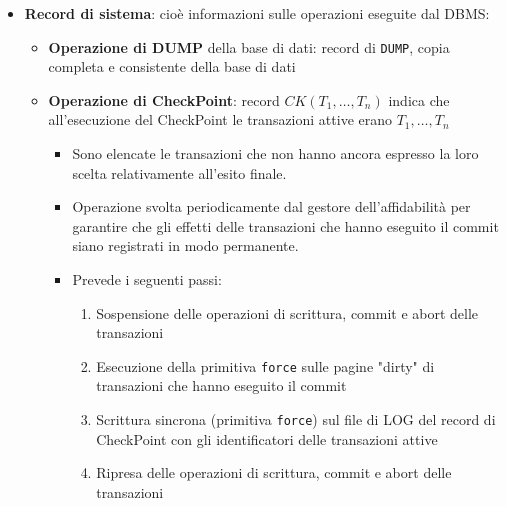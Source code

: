 \documentclass[a4paper]{article}
\begin{document}
\begin{itemize}
\begin{itemize}
      \item \textbf{REDO}: per rifare un’azione su un oggetto \( O \) è sufficiente
        ricopiare in \( O \) il valore \( AS \); l’insert/delete viene rifatto
        inserendo/cancellando \( O \)
    \end{itemize}
    Gli inserimenti controllano sempre l'esistenza dell'oggetto \( O \) prima di eseguire
    l'operazione, quindi non vengono inseriti i duplicati

    Per queste operazioni vale la \textbf{proprietà di idempotenza}, cioè:
    \[
      \begin{aligned}
        UNDO(UNDO(A)) &= UNDO(A) \\
        REDO(REDO(A)) &= REDO(A)
      \end{aligned}
    \] 

  \item \textbf{Record di sistema}: cioè informazioni sulle operazioni eseguite dal
    DBMS:
    \begin{itemize}
      \item \textbf{Operazione di DUMP} della base di dati: record di \texttt{DUMP}, copia
      completa e consistente della base di dati

      \item \textbf{Operazione di CheckPoint}: record \( CK(T_1, \ldots, T_n) \)
        indica che all'esecuzione del CheckPoint le transazioni attive erano
        \( T_1, \ldots, T_n \) 
        \begin{itemize}
          \item Sono elencate le transazioni che non hanno ancora espresso la loro
            scelta relativamente all'esito finale.

          \item Operazione svolta periodicamente dal gestore dell'affidabilità per
            garantire che gli effetti delle transazioni che hanno eseguito il commit
            siano registrati in modo permanente.

          \item Prevede i seguenti passi:
            \begin{enumerate}
              \item Sospensione delle operazioni di scrittura, commit e abort delle
                transazioni

              \item Esecuzione della primitiva \texttt{force} sulle pagine "dirty" di
                transazioni che hanno eseguito il commit

              \item Scrittura sincrona (primitiva \texttt{force}) sul file di LOG del
                record di CheckPoint con gli identificatori delle transazioni attive

              \item Ripresa delle operazioni di scrittura, commit e abort delle transazioni
            \end{enumerate}
        \end{itemize}
    \end{itemize}
\end{itemize}
\end{document}
